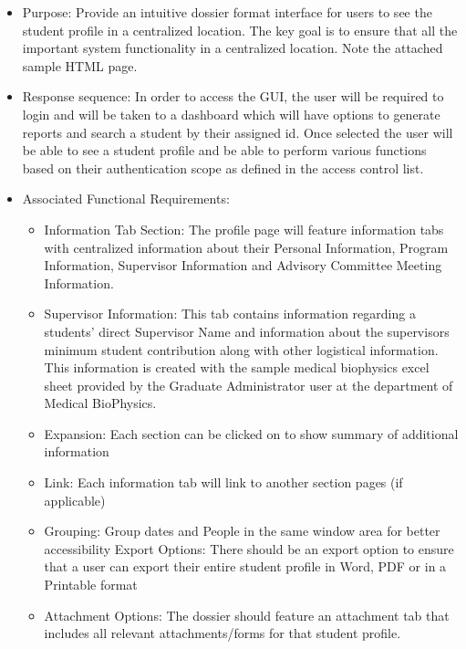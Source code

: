 \documentclass[11pt,a4paper]{report}
\begin{document}
\begin{itemize}
\item Purpose: Provide an intuitive dossier format interface for users to see the student profile in a centralized location. The key goal is to ensure that all the important system functionality in a centralized location. Note the attached sample HTML page.
\item Response sequence: In order to access the GUI, the user will be required to login and will be taken to a dashboard which will have options to generate reports and search a student by their assigned id. Once selected the user will be able to see a student profile and be able to perform various functions based on their authentication scope as defined in the access control list.
\item Associated Functional Requirements:
\begin{itemize}
\item Information Tab Section: The profile page will feature information tabs with centralized information about their Personal Information, Program Information, Supervisor Information and Advisory Committee Meeting Information.
\item Supervisor Information: This tab contains information regarding a students’ direct Supervisor Name and information about the supervisors minimum student contribution along with other logistical information. This information is created with the sample medical biophysics excel sheet provided by the Graduate Administrator user at the department of Medical BioPhysics.	

\item Expansion: Each section can be clicked on to show summary of additional information
\item Link:  Each information tab will link to another section pages (if applicable)
\item Grouping: Group dates and People in the same window area for better accessibility
Export Options: There should be an export option to ensure that a user can export their entire student profile in Word, PDF or in a Printable format
\item Attachment Options: The dossier should feature an attachment tab that includes all relevant attachments/forms for that student profile.
\end{itemize}
\end{itemize}
\end{document}
